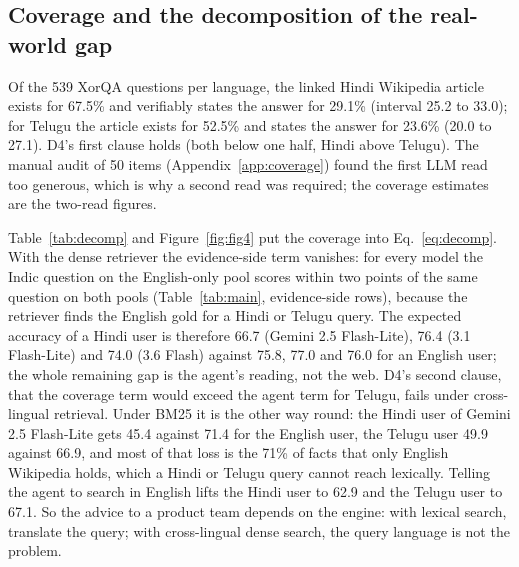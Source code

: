 \subsection{Coverage and the decomposition of the real-world gap}
\label{sec:results-decomp}

Of the 539 XorQA questions per language, the linked Hindi Wikipedia article exists for 67.5\% and verifiably states the answer for 29.1\% (interval 25.2 to 33.0); for Telugu the article exists for 52.5\% and states the answer for 23.6\% (20.0 to 27.1). D4's first clause holds (both below one half, Hindi above Telugu). The manual audit of 50 items (Appendix~\ref{app:coverage}) found the first LLM read too generous, which is why a second read was required; the coverage estimates are the two-read figures.

Table~\ref{tab:decomp} and Figure~\ref{fig:fig4} put the coverage into Eq.~\ref{eq:decomp}. With the dense retriever the evidence-side term vanishes: for every model the Indic question on the English-only pool scores within two points of the same question on both pools (Table~\ref{tab:main}, evidence-side rows), because the retriever finds the English gold for a Hindi or Telugu query. The expected accuracy of a Hindi user is therefore 66.7 (Gemini 2.5 Flash-Lite), 76.4 (3.1 Flash-Lite) and 74.0 (3.6 Flash) against 75.8, 77.0 and 76.0 for an English user; the whole remaining gap is the agent's reading, not the web. D4's second clause, that the coverage term would exceed the agent term for Telugu, fails under cross-lingual retrieval. Under BM25 it is the other way round: the Hindi user of Gemini 2.5 Flash-Lite gets 45.4 against 71.4 for the English user, the Telugu user 49.9 against 66.9, and most of that loss is the 71\% of facts that only English Wikipedia holds, which a Hindi or Telugu query cannot reach lexically. Telling the agent to search in English lifts the Hindi user to 62.9 and the Telugu user to 67.1. So the advice to a product team depends on the engine: with lexical search, translate the query; with cross-lingual dense search, the query language is not the problem.

